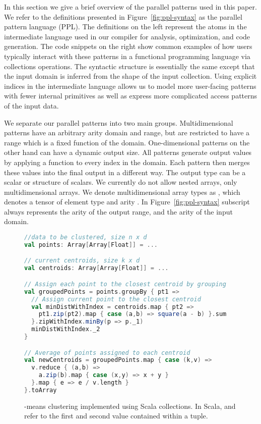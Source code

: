 \documentclass[pageno]{jpaper}
\begin{document}
In this section we give a brief overview of the parallel patterns used in this paper.
We refer to the definitions presented in Figure~\ref{fig:ppl-syntax} as the parallel pattern language (PPL).
The definitions on the left represent the atoms in the intermediate language used in our compiler for analysis, optimization, and code generation. The code snippets on the right show common examples of how users typically interact with these patterns in a functional programming language via collections operations. The syntactic structure is essentially the same except that the input domain is inferred from the shape of the input collection.  Using explicit indices in the intermediate language allows us to model more user-facing patterns with fewer internal primitives
as well as express more complicated access patterns of the input data.

We separate our parallel patterns into two main groups. Multidimensional patterns have an arbitrary arity domain and range, but are restricted to have a range which is a fixed function of the domain. One-dimensional patterns on the other hand can have a dynamic output size. All patterns generate output values by applying a function to every index in the domain. Each pattern then merges these values into the final output in a different way. The output type  can be a scalar or structure of scalars. We currently do not allow nested arrays, only multidimensional arrays. We denote multidimensional array types as , which denotes a tensor of element type  and arity .  In Figure~\ref{fig:ppl-syntax} subscript  always represents the arity of the output range, and  the arity of the input domain.











\begin{figure}\centering
\begin{lstlisting}[language=Scala]
//data to be clustered, size n x d
val points: Array[Array[Float]] = ...

// current centroids, size k x d
val centroids: Array[Array[Float]] = ...

// Assign each point to the closest centroid by grouping
val groupedPoints = points.groupBy { pt1 =>
  // Assign current point to the closest centroid
  val minDistWithIndex = centroids.map { pt2 =>
    pt1.zip(pt2).map { case (a,b) => square(a - b) }.sum
  }.zipWithIndex.minBy(p => p._1)
  minDistWithIndex._2
}

// Average of points assigned to each centroid
val newCentroids = groupedPoints.map { case (k,v) =>
  v.reduce { (a,b) =>
    a.zip(b).map { case (x,y) => x + y }
  }.map { e => e / v.length }
}.toArray
\end{lstlisting}
\caption{-means clustering implemented using Scala collections. In Scala, \texttt{} and \texttt{} refer to the first and second value contained within a tuple.}
\label{fig:kmeans}
\end{figure}
\end{document}
